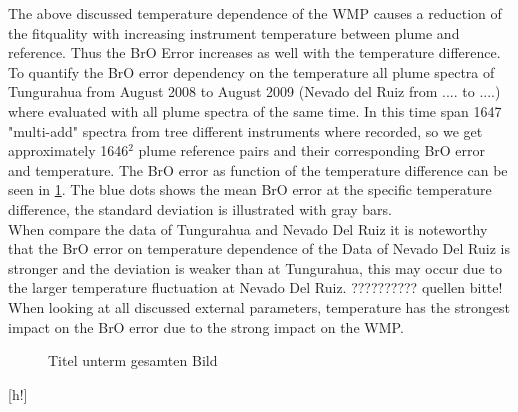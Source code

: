 \documentclass  [
  paper    = a4,
  BCOR     = 10mm,
  twoside,
  fontsize = 12pt,
  fleqn,
  toc      = bibnumbered,
  toc      = listofnumbered,
  numbers  = noendperiod,
  headings = normal,
  listof   = leveldown,
  version  = 3.03
]                                       {scrreprt}
\begin{document}
	
	The above discussed temperature dependence of the WMP causes a reduction of the fitquality with increasing instrument temperature between plume and reference. Thus the BrO Error increases as well with the temperature difference. To quantify the BrO error dependency on the temperature all plume spectra of Tungurahua from August 2008 to August 2009 (Nevado del Ruiz from .... to ....) where evaluated with all plume spectra of the same time. In this time span 1647 "multi-add" spectra from tree different instruments where recorded, so we get approximately 1646$^2$ plume reference pairs and their corresponding BrO error and temperature. The BrO error as function of the temperature difference can be seen in \cref{fig:difftemp}. The blue dots shows the mean BrO error at the specific temperature difference, the standard deviation is illustrated with gray bars.\\
	When compare the data of Tungurahua  and Nevado Del Ruiz it is noteworthy that the BrO error on temperature dependence of the Data of Nevado Del Ruiz is stronger and the deviation is weaker than at Tungurahua, this may occur due to the larger temperature fluctuation at Nevado Del Ruiz. ?????????? quellen bitte!\\
	When looking at all discussed external parameters, temperature has  the strongest impact on the BrO error due to the strong impact on the WMP.
	\begin{figure}[h!]			
		\caption{Titel unterm gesamten Bild}
		\label{fig:difftemp}
	\end{figure}[h!]
\end{document}
